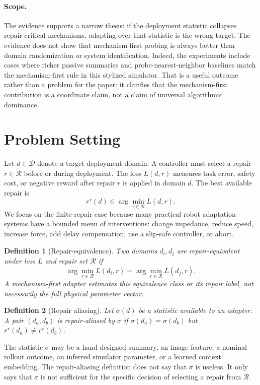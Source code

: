 \documentclass{article}
\newtheorem{definition}{Definition}
\begin{document}
\paragraph{Scope.}
The evidence supports a narrow thesis: if the deployment statistic collapses
repair-critical mechanisms, adapting over that statistic is the wrong target. The
evidence does not show that mechanism-first probing is always better than domain
randomization or system identification. Indeed, the experiments include cases
where richer passive summaries and probe-nearest-neighbor baselines match the
mechanism-first rule in this stylized simulator. That is a useful outcome rather
than a problem for the paper: it clarifies that the mechanism-first contribution
is a coordinate claim, not a claim of universal algorithmic dominance.

\section{Problem Setting}

Let $d \in \mathcal{D}$ denote a target deployment domain. A controller must
select a repair $r \in \mathcal{R}$ before or during deployment. The loss
$L(d,r)$ measures task error, safety cost, or negative reward after repair $r$ is
applied in domain $d$. The best available repair is
\[
r^\star(d) \in \arg\min_{r \in \mathcal{R}} L(d,r).
\]
We focus on the finite-repair case because many practical robot adaptation
systems have a bounded menu of interventions: change impedance, reduce speed,
increase force, add delay compensation, use a slip-safe controller, or abort.

\begin{definition}[Repair-equivalence]
Two domains $d_i,d_j$ are repair-equivalent under loss $L$ and repair set
$\mathcal{R}$ if
\[
\arg\min_{r\in \mathcal{R}} L(d_i,r)
= \arg\min_{r\in \mathcal{R}} L(d_j,r).
\]
A mechanism-first adapter estimates this equivalence class or its repair label,
not necessarily the full physical parameter vector.
\end{definition}

\begin{definition}[Repair aliasing]
Let $\sigma(d)$ be a statistic available to an adapter. A pair
$(d_a,d_b)$ is repair-aliased by $\sigma$ if $\sigma(d_a)=\sigma(d_b)$ but
$r^\star(d_a) \neq r^\star(d_b)$.
\end{definition}

The statistic $\sigma$ may be a hand-designed summary, an image feature, a
nominal rollout outcome, an inferred simulator parameter, or a learned context
embedding. The repair-aliasing definition does not say that $\sigma$ is useless.
It only says that $\sigma$ is not sufficient for the specific decision of
selecting a repair from $\mathcal{R}$.
\end{document}
